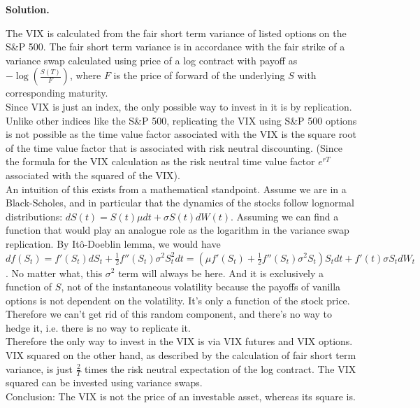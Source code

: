 \documentclass[12pt]{article}
\newenvironment{solution}{\vspace{0.2cm} \textbf{Solution.}}{}
\begin{document}
\begin{solution}

The VIX is calculated from the fair short term variance of listed options on the S\&P 500. The fair short term variance is in accordance with the fair strike of a variance swap calculated using price of a log contract with payoff as $-\log (\frac{S(T)}{F})$, where $F$ is the price of forward of the underlying $S$ with corresponding maturity.
\\

Since VIX is just an index, the only possible way to invest in it is by replication. Unlike other indices like the S\&P 500, replicating the VIX using S\&P 500 options is not possible as the time value factor associated with the VIX is the square root of the time value factor that is associated with risk neutral discounting. (Since the formula for the VIX calculation as the risk neutral time value factor $e^{rT}$ associated with the squared of the VIX).
\\

An intuition of this exists from a mathematical standpoint. Assume we are in a Black-Scholes, and in particular that the dynamics of the stocks follow lognormal distributions: $dS (t) = S (t) \mu dt + \sigma S (t) dW (t)$. Assuming we can find a function that would play an analogue role as the logarithm in the variance swap replication. By It\^o-Doeblin lemma, we would have $df(S_t) = f'(S_t)dS_t + \frac{1}{2} f''(S_t) \sigma^2 S^2_t dt = (\mu f'(S_t) + \frac{1}{2} f''(S_t) \sigma^2 S_t) S_t dt + f'(t) \sigma S_t dW_t$. No matter what, this $\sigma^2$ term will always be here. And it is exclusively a function of $S$, not of the instantaneous volatility because the payoffs of vanilla options is not dependent on the volatility. It's only a function of the stock price. Therefore we can't get rid of this random component, and there's no way to hedge it, i.e. there is no way to replicate it.
\\

Therefore the only way to invest in the VIX is via VIX futures and VIX options.
\\

VIX squared on the other hand, as described by the calculation of fair short term variance, is just $\frac{2}{T}$ times the risk neutral expectation of the log contract. The VIX squared can be invested using variance swaps.
\\

Conclusion: The VIX is not the price of an investable asset, whereas its square is. 

\end{solution}
\end{document}
